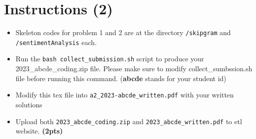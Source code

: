 \documentclass{assignment format}
\begin{document}
\begin{center}

\end{center}
\def\showanswers{1}

\section{Instructions (2)}
\begin{itemize}
\item Skeleton codes for problem 1 and 2 are at the directory \texttt{/skipgram} and \texttt{/sentimentAnalysis} each. 
\item Run the \texttt{bash collect\_submission.sh} script to produce your 2023\_abcde\_coding.zip file. Please make sure to modify collect\_sumbssion.sh file before running this command. (\textbf{abcde} stands for your student id)
\item Modify this tex file into \texttt{a2\_2023-abcde\_written.pdf} with your written solutions
\item Upload both \texttt{2023\_abcde\_coding.zip} and \texttt{2023\_abcde\_written.pdf} to etl website. \textbf{(2pts)}\\
\end{itemize}



\end{document}
